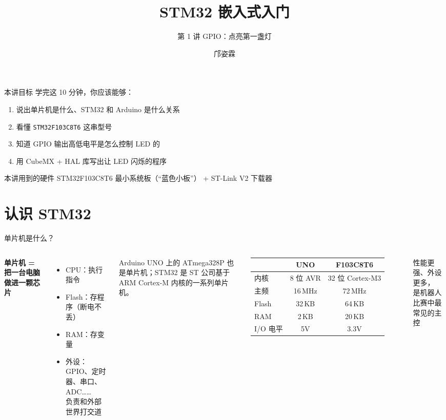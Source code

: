 \documentclass[aspectratio=169,11pt]{ctexbeamer}
\title{STM32 嵌入式入门}
\subtitle{第 1 讲 \quad GPIO：点亮第一盏灯}
\author{邝姿霖}
\institute{浙江大学学生机器人协会 · 教学部}
\date{}
\begin{document}
\begin{frame}
  \titlepage
\end{frame}

\begin{frame}{本讲目标}
  学完这 10 分钟，你应该能够：
  \begin{enumerate}
    \item 说出单片机是什么、STM32 和 Arduino 是什么关系
    \item 看懂 \texttt{STM32F103C8T6} 这串型号
    \item 知道 GPIO 输出高低电平是怎么控制 LED 的
    \item 用 CubeMX + HAL 库写出让 LED 闪烁的程序
  \end{enumerate}
  \vspace{1em}
  \begin{block}{本讲用到的硬件}
    STM32F103C8T6 最小系统板（“蓝色小板”） + ST-Link V2 下载器
  \end{block}
\end{frame}

\section{认识 STM32}

\begin{frame}{单片机是什么？}
  \begin{columns}[T]
    \textbf{单片机 = 把一台电脑做进一颗芯片}
    \begin{itemize}
      \item CPU：执行指令
      \item Flash：存程序（断电不丢）
      \item RAM：存变量
      \item \alert{外设}：GPIO、定时器、串口、ADC……\\负责和外部世界打交道
    \end{itemize}
    \vspace{0.5em}
    Arduino UNO 上的 ATmega328P 也是单片机；STM32 是 ST 公司基于 ARM Cortex-M 内核的一系列单片机。
    \centering\small
    \begin{tabular}{lcc}
      \toprule
       & UNO & F103C8T6 \\
      \midrule
      内核 & 8 位 AVR & 32 位 Cortex-M3 \\
      主频 & 16\,MHz & 72\,MHz \\
      Flash & 32\,KB & 64\,KB \\
      RAM & 2\,KB & 20\,KB \\
      I/O 电平 & 5V & \alert{3.3V} \\
      \bottomrule
    \end{tabular}
    \vspace{0.5em}

    性能更强、外设更多，\\是机器人比赛中最常见的主控
  \end{columns}
\end{frame}
\end{document}
